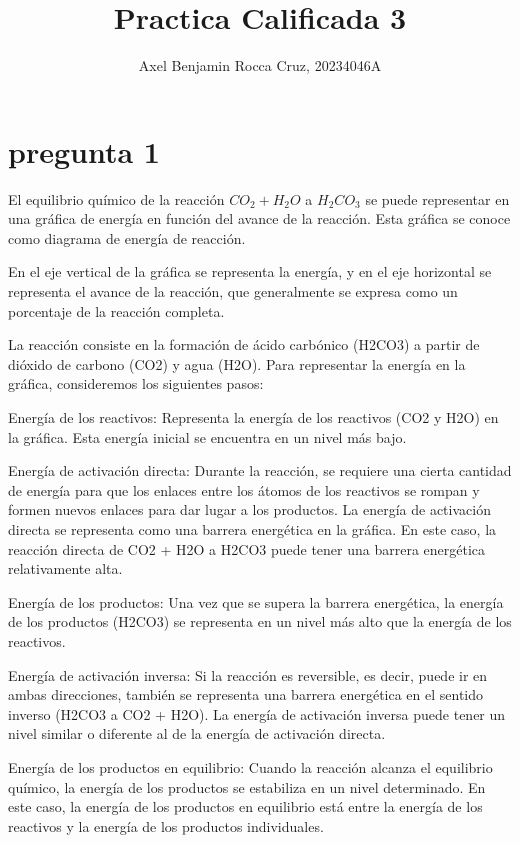 \documentclass[11pt]{scrartcl}
\author{Axel Benjamin Rocca Cruz, 20234046A}
\title{Practica Calificada 3}
\begin{document}
\maketitle
\section{pregunta 1}
El equilibrio químico de la reacción $CO_{2} + H_{2}O$ a $H_{2}CO_{3}$ se puede representar en una gráfica de energía en función del avance de la reacción. Esta gráfica se conoce como diagrama de energía de reacción.

En el eje vertical de la gráfica se representa la energía, y en el eje horizontal se representa el avance de la reacción, que generalmente se expresa como un porcentaje de la reacción completa.

La reacción consiste en la formación de ácido carbónico (H2CO3) a partir de dióxido de carbono (CO2) y agua (H2O). Para representar la energía en la gráfica, consideremos los siguientes pasos:

    Energía de los reactivos: Representa la energía de los reactivos (CO2 y H2O) en la gráfica. Esta energía inicial se encuentra en un nivel más bajo.

    Energía de activación directa: Durante la reacción, se requiere una cierta cantidad de energía para que los enlaces entre los átomos de los reactivos se rompan y formen nuevos enlaces para dar lugar a los productos. La energía de activación directa se representa como una barrera energética en la gráfica. En este caso, la reacción directa de CO2 + H2O a H2CO3 puede tener una barrera energética relativamente alta.

    Energía de los productos: Una vez que se supera la barrera energética, la energía de los productos (H2CO3) se representa en un nivel más alto que la energía de los reactivos.

    Energía de activación inversa: Si la reacción es reversible, es decir, puede ir en ambas direcciones, también se representa una barrera energética en el sentido inverso (H2CO3 a CO2 + H2O). La energía de activación inversa puede tener un nivel similar o diferente al de la energía de activación directa.

    Energía de los productos en equilibrio: Cuando la reacción alcanza el equilibrio químico, la energía de los productos se estabiliza en un nivel determinado. En este caso, la energía de los productos en equilibrio está entre la energía de los reactivos y la energía de los productos individuales.
\end{document}
